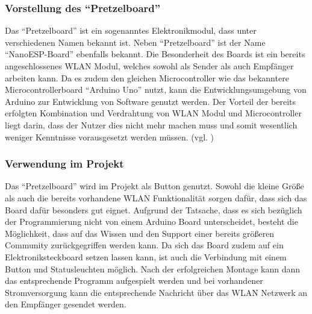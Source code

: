 \subsubsection{Vorstellung des ``Pretzelboard''}        
\label{sec:Vorstellung des ``Pretzelboard''} 
Das ``Pretzelboard'' ist ein sogenanntes Elektronikmodul, dass unter verschiedenen Namen bekannt ist. Neben ``Pretzelboard'' ist der Name ``NanoESP-Board'' ebenfalls bekannt. Die Besonderheit des Boards ist ein bereits angeschlossenes WLAN Modul, welches sowohl als Sender als auch Empfänger arbeiten kann. Da es zudem den gleichen Microcontroller wie das bekanntere Microcontrollerboard ``Arduino Uno'' nutzt, kann die Entwicklungsumgebung von Arduino zur Entwicklung von Software genutzt werden. 
Der Vorteil der bereits erfolgten Kombination und Verdrahtung von WLAN Modul und Microcontroller liegt darin, dass der Nutzer dies nicht mehr machen muss und somit wesentlich weniger Kenntnisse vorausgesetzt werden müssen. (vgl. \cite{.b}\cite{.kafka}\cite{FranzisVerlagGmbH.27.11.2015})


\subsubsection{Verwendung im Projekt}        
\label{sec:Verwendung des ``Pretzelboard''} 
Das ``Pretzelboard'' wird im Projekt als Button genutzt. Sowohl die kleine Größe als auch die bereits vorhandene WLAN Funktionalität sorgen dafür, dass sich das Board dafür besonders gut eignet. Aufgrund der Tatsache, dass es sich bezüglich der Programmierung nicht von einem Arduino Board unterscheidet, besteht die Möglichkeit, dass auf das Wissen und den Support einer bereits größeren Community zurückgegriffen werden kann. 
Da sich das Board zudem auf ein Elektroniksteckboard setzen lassen kann, ist auch die Verbindung mit einem Button und Statusleuchten möglich. Nach der erfolgreichen Montage kann dann das entsprechende Programm aufgespielt werden und bei vorhandener Stromversorgung kann die entsprechende Nachricht über das WLAN Netzwerk an den Empfänger gesendet werden. 

\newpage
